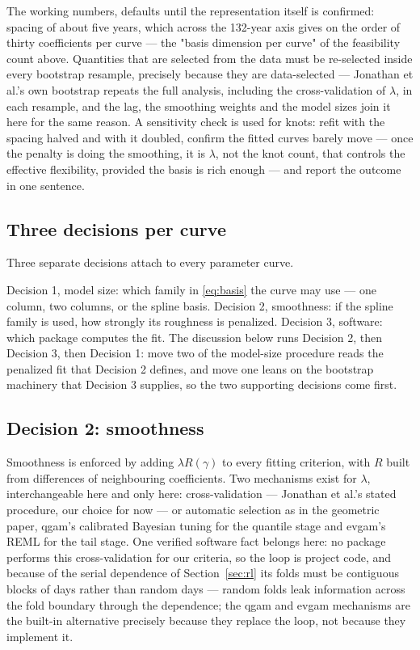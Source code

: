\documentclass[11pt]{article}
\begin{document}
{The working numbers, defaults until the representation itself is confirmed: spacing of about five years, which across the 132-year axis gives on the order of thirty coefficients per curve — the "basis dimension per curve" of the feasibility count above. Quantities that are selected from the data must be re-selected inside every bootstrap resample, precisely because they are data-selected — Jonathan et al.'s own bootstrap repeats the full analysis, including the cross-validation of $\lambda$, in each resample, and the lag, the smoothing weights and the model sizes join it here for the same reason. 
A sensitivity check is used for knots: refit with the spacing halved and with it doubled, confirm the fitted curves barely move — once the penalty is doing the smoothing, it is $\lambda$, not the knot count, that controls the effective flexibility, provided the basis is rich enough — and report the outcome in one sentence. }

\subsection{Three decisions per curve}\label{sec:threedec}

Three separate decisions attach to every parameter curve. 

Decision 1, model size: which family in \eqref{eq:basis} the curve may use --- one column, two columns, or the spline basis. Decision 2, smoothness: if the spline family is used, how strongly its roughness is penalized. Decision 3, software: which package computes the fit. The discussion below runs Decision 2, then Decision 3, then Decision 1: move two of the model-size procedure reads the penalized fit that Decision 2 defines, and move one leans on the bootstrap machinery that Decision 3 supplies, so the two supporting decisions come first. 

\subsection{Decision 2: smoothness}\label{sec:smooth}

Smoothness is enforced by adding $\lambda R(\gamma)$ to every fitting criterion, with $R$ built from differences of neighbouring coefficients. Two mechanisms exist for $\lambda$, interchangeable here and only here: cross-validation --- Jonathan et al.'s stated procedure, our choice for now --- or automatic selection as in the geometric paper, qgam's calibrated Bayesian tuning for the quantile stage and evgam's REML for the tail stage. {\color{blue}One verified software fact belongs here: no package performs this cross-validation for our criteria, so the loop is project code, and because of the serial dependence of Section~\ref{sec:rl} its folds must be contiguous blocks of days rather than random days --- random folds leak information across the fold boundary through the dependence; the qgam and evgam mechanisms are the built-in alternative precisely because they replace the loop, not because they implement it.}
\end{document}

